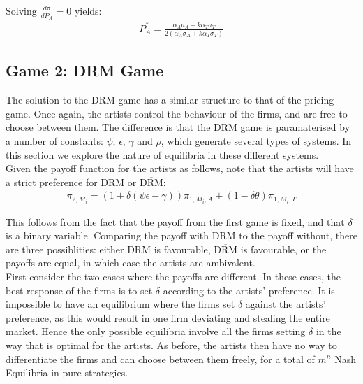 \documentclass[a4paper,12pt]{article}
\numberwithin{equation}{section}
\newcommand{\drm}{\text{DRM}}
\newcommand{\nodrm}{\overline{\drm}}
\newcommand{\artistpayoff}[2]{\pi_{#1, M_{#2}}}
\newcommand{\artistalbum}[2]{\pi_{#1, M_{#2}, A}}
\newcommand{\artistticket}[2]{\pi_{#1, M_{#2}, T}}
\newcommand{\deriv}[2]{\frac{d #1}{d #2}}
\begin{document}
Solving $\deriv{\pi}{P_A} = 0$ yields:
\begin{eqnarray}
P_A^* = \frac{\alpha_A a_A + k \alpha_T a_T}{2(\alpha_A \sigma_A + k \alpha_T \sigma_T)}
\end{eqnarray}

\subsection{Game 2: DRM Game}

The solution to the DRM game has a similar structure to that of the pricing game. Once again, the artists control the behaviour of the firms, and are free to choose between them. The difference is that the DRM game is paramaterised by a number of constants: $\psi$, $\epsilon$, $\gamma$ and $\rho$, which generate several types of systems. In this section we explore the nature of equilibria in these different systems.\\

Given the payoff function for the artists as follows, note that the artists will have a strict preference for DRM or $\overline{\text{DRM}}$:
\begin{eqnarray*}
\artistpayoff{2}{i} = (1 + \delta (\psi \epsilon - \gamma)) \artistalbum{1}{i} + (1 - \delta \theta) \artistticket{1}{i}
\end{eqnarray*}

This follows from the fact that the payoff from the first game is fixed, and that $\delta$ is a binary variable. Comparing the payoff with DRM to the payoff without, there are three possiblities: either DRM is favourable, $\nodrm$ is favourable, or the payoffs are equal, in which case the artists are ambivalent.\\

First consider the two cases where the payoffs are different. In these cases, the best response of the firms is to set $\delta$ according to the artists' preference. It is impossible to have an equilibrium where the firms set $\delta$ against the artists' preference, as this would result in one firm deviating and stealing the entire market. Hence the only possible equilibria involve all the firms setting $\delta$ in the way that is optimal for the artists. As before, the artists then have no way to differentiate the firms and can choose between them freely, for a total of $m^n$ Nash Equilibria in pure strategies.\\
\end{document}
